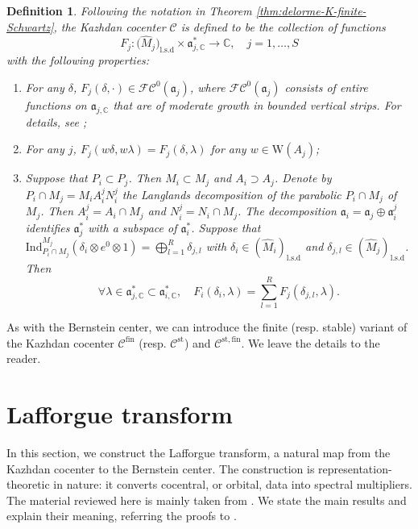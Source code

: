 \documentclass[iccmp]{ipbook}
\newcommand{\BC}{{\mathbb {C}}}
\newcommand{\CC}{{\mathcal {C}}}
\newcommand{\CF}{{\mathcal {F}}}
\newcommand{\Fa}{{\mathfrak {a}}}
\newcommand{\RW}{{\mathrm {W}}}
\newcommand{\Ind}{{\mathrm{Ind}}}
\newcommand{\st}{{\mathrm{st}}}
\def\del{{\delta}}
\def\lam{{\lambda}}
\newcommand{\fin}{\mathrm{fin}}
\newtheorem{defin}[thm]{Definition}
\begin{document}
\begin{defin}\label{defin:KCC-archimedean}
Following the notation in Theorem \ref{thm:delorme-K-finite-Schwartz}, the Kazhdan cocenter $\CC$ is defined to be the collection of functions 
$$
F_j:
\big(
\hat{M}_j
\big)_{\mathrm{l.s.d}}
\times \Fa^*_{j,\BC}\to \BC,\quad j=1,\ldots,S
$$
with the following properties:
\begin{enumerate}
\item For any $\del$, $F_j(\del,\cdot)\in \CF\CC^0(\Fa_j)$, where $\CF\CC^0(\Fa_j)$ consists of entire functions on $\Fa_{j,\BC}$ that are of moderate growth in bounded vertical strips. For details, see \cite[p.696]{MR0860667};

\item For any $j$, $F_j(w\del,w\lam) = F_j(\del,\lam)$ for any $w\in \RW(A_j)$;

\item Suppose that $P_i\subset P_j$. Then $M_i\subset M_j$ and $A_i\supset A_j$. Denote by $P_i\cap M_j = M_iA^j_iN^j_i$ the Langlands decomposition of the parabolic $P_i\cap M_j$ of $M_j$. Then $A^j_i = A_i\cap M_j$ and $N^j_i = N_i\cap M_j$. The decomposition $\Fa_i = \Fa_j\oplus \Fa^j_i$ identifies $\Fa^*_j$ with a subspace of $\Fa^*_i$. Suppose that $\Ind^{M_j}_{P_i\cap M_j}(\del_i\otimes e^0\otimes 1) = \bigoplus_{l=1}^R \del_{j,l}$ with $\del_i\in (\hat{M}_i)_{\mathrm{l.s.d}}$ and $\del_{j,l}\in (\hat{M}_j)_{\mathrm{l.s.d}}$. Then
$$
\forall \lam\in \Fa^*_{j,\BC}\subset \Fa^*_{i,\BC}, \quad 
F_i(\del_i,\lam) = 
\sum_{l=1}^R F_j(\del_{j,l},\lam).
$$
\end{enumerate}
\end{defin}

As with the Bernstein center, we can introduce the finite (resp. stable) variant of the
Kazhdan cocenter $\CC^{\fin}$ (resp. $\CC^\st$) and $\CC^{\st,\fin}$.
We leave the details to the reader.







\section{Lafforgue transform}\label{sec:lafforgue_transform}

In this section, we construct the Lafforgue transform, a natural map from the
Kazhdan cocenter to the Bernstein center. The construction is representation-theoretic
in nature: it converts cocentral, or orbital, data into spectral multipliers. The material
reviewed here is mainly taken from \cite[\S 5]{LN}. We state the main results and explain
their meaning, referring the proofs to \cite{LN}.
\end{document}
